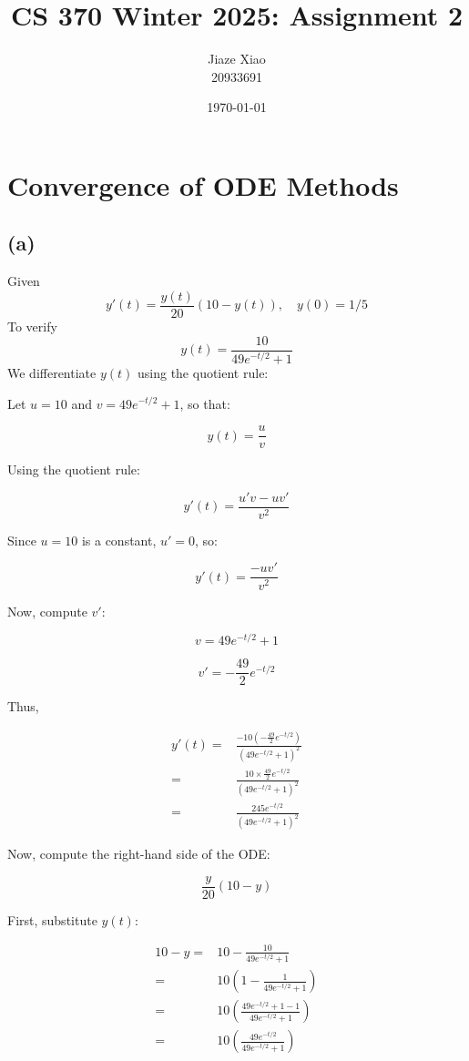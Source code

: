 \documentclass{article}
\title{\textbf{CS 370 Winter 2025: Assignment 2}}
\author{Jiaze Xiao \\ 20933691}
\date{\today}
\begin{document}
\maketitle

\section{Convergence of ODE Methods}
\subsection*{(a)}
Given
$$
    y'(t)=\dfrac{y(t)}{20}(10-y(t)),\quad y(0)=1/5
$$
To verify
$$
    y(t)=\dfrac{10}{49e^{-t/2}+1}
$$
We differentiate $ y(t) $ using the quotient rule:

Let $ u = 10 $ and $ v = 49e^{-t/2} + 1 $, so that:

$$
    y(t) = \frac{u}{v}
$$

Using the quotient rule:

$$
    y'(t) = \frac{u' v - u v'}{v^2}
$$

Since $ u = 10 $ is a constant, $ u' = 0 $, so:

$$
    y'(t) = \frac{-u v'}{v^2}
$$

Now, compute $ v' $:

$$
    v = 49e^{-t/2} + 1
$$

$$
    v' = -\frac{49}{2} e^{-t/2}
$$

Thus,

\begin{align*}
    y'(t) = & \frac{-10 \left(-\frac{49}{2} e^{-t/2} \right)}{(49e^{-t/2} + 1)^2} \\
    =       & \frac{10 \times \frac{49}{2} e^{-t/2}}{(49e^{-t/2} + 1)^2}          \\
    =       & \frac{245 e^{-t/2}}{(49e^{-t/2} + 1)^2}
\end{align*}

Now, compute the right-hand side of the ODE:

$$
    \frac{y}{20} (10 - y)
$$

First, substitute $ y(t) $:

\begin{align*}
    10 - y = & 10 - \frac{10}{49e^{-t/2} + 1}                             \\
    =        & 10 \left(1 - \frac{1}{49e^{-t/2} + 1} \right)              \\
    =        & 10 \left(\frac{49e^{-t/2} + 1 - 1}{49e^{-t/2} + 1} \right) \\
    =        & 10 \left(\frac{49e^{-t/2}}{49e^{-t/2} + 1} \right)
\end{align*}
\end{document}
